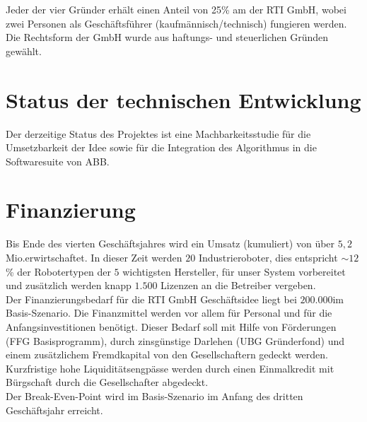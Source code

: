 Jeder der vier Gründer erhält einen Anteil von 25\% am der \textsf{RTI GmbH}, wobei zwei Personen als Geschäftsführer (kaufmännisch/technisch) fungieren werden. Die Rechtsform der GmbH wurde aus haftungs- und steuerlichen Gründen gewählt.


\section{Status der technischen Entwicklung}

Der derzeitige Status des Projektes ist eine Machbarkeitsstudie für die Umsetzbarkeit der Idee sowie für die Integration des Algorithmus in die Softwaresuite von ABB.

\section{Finanzierung}
Bis Ende des vierten Geschäftsjahres wird ein Umsatz (kumuliert) von über $5,2$Mio.\thinspace\officialeuro erwirtschaftet. In dieser Zeit werden $20$ Industrieroboter, dies entspricht $\sim12$\% der Robotertypen der $5$ wichtigsten Hersteller, für unser System vorbereitet und zusätzlich werden knapp $1.500$ Lizenzen an die Betreiber vergeben.\\
Der Finanzierungsbedarf für die \textsf{RTI GmbH} Geschäftsidee liegt bei $200.000$\officialeuro im Basis-Szenario. Die Finanzmittel werden vor allem für Personal und für die Anfangsinvestitionen benötigt. Dieser Bedarf soll mit Hilfe von Förderungen (FFG Basisprogramm), durch zinsgünstige Darlehen (UBG Gründerfond) und einem zusätzlichem Fremdkapital von den Gesellschaftern gedeckt werden. Kurzfristige hohe Liquiditätsengpässe werden durch einen Einmalkredit mit Bürgschaft durch die Gesellschafter abgedeckt.\\
Der Break-Even-Point wird im Basis-Szenario im Anfang des dritten Geschäftsjahr erreicht.



